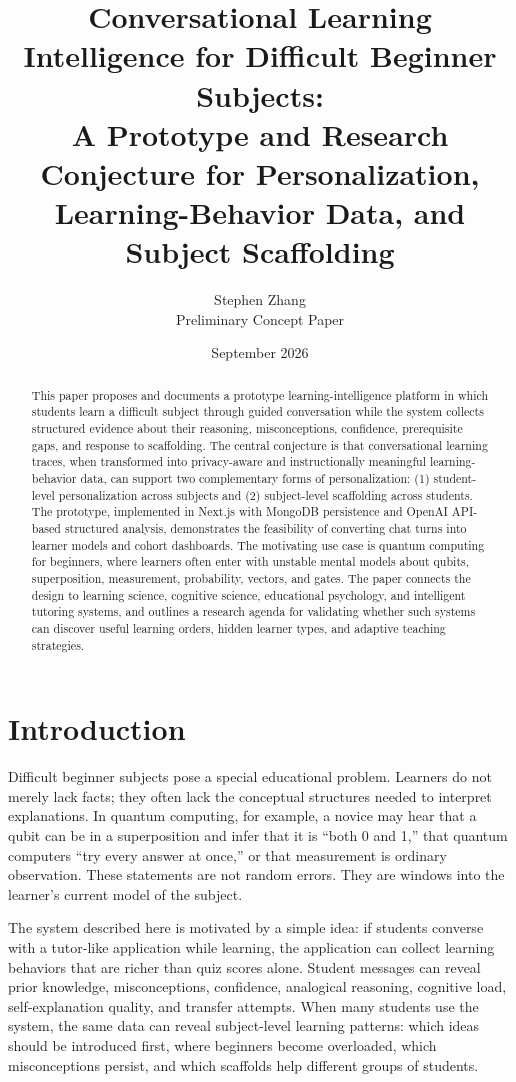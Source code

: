 \documentclass[11pt]{article}
\title{\textbf{Conversational Learning Intelligence for Difficult Beginner Subjects:}\\
A Prototype and Research Conjecture for Personalization, Learning-Behavior Data, and Subject Scaffolding}
\author{Stephen Zhang\\
Preliminary Concept Paper}
\date{September 2026}
\begin{document}
\maketitle

\begin{abstract}
This paper proposes and documents a prototype learning-intelligence platform in which students learn a difficult subject through guided conversation while the system collects structured evidence about their reasoning, misconceptions, confidence, prerequisite gaps, and response to scaffolding. The central conjecture is that conversational learning traces, when transformed into privacy-aware and instructionally meaningful learning-behavior data, can support two complementary forms of personalization: (1) student-level personalization across subjects and (2) subject-level scaffolding across students. The prototype, implemented in Next.js with MongoDB persistence and OpenAI API-based structured analysis, demonstrates the feasibility of converting chat turns into learner models and cohort dashboards. The motivating use case is quantum computing for beginners, where learners often enter with unstable mental models about qubits, superposition, measurement, probability, vectors, and gates. The paper connects the design to learning science, cognitive science, educational psychology, and intelligent tutoring systems, and outlines a research agenda for validating whether such systems can discover useful learning orders, hidden learner types, and adaptive teaching strategies.
\end{abstract}

\section{Introduction}

Difficult beginner subjects pose a special educational problem. Learners do not merely lack facts; they often lack the conceptual structures needed to interpret explanations. In quantum computing, for example, a novice may hear that a qubit can be in a superposition and infer that it is ``both 0 and 1,'' that quantum computers ``try every answer at once,'' or that measurement is ordinary observation. These statements are not random errors. They are windows into the learner's current model of the subject.

The system described here is motivated by a simple idea: if students converse with a tutor-like application while learning, the application can collect learning behaviors that are richer than quiz scores alone. Student messages can reveal prior knowledge, misconceptions, confidence, analogical reasoning, cognitive load, self-explanation quality, and transfer attempts. When many students use the system, the same data can reveal subject-level learning patterns: which ideas should be introduced first, where beginners become overloaded, which misconceptions persist, and which scaffolds help different groups of students.
\end{document}
